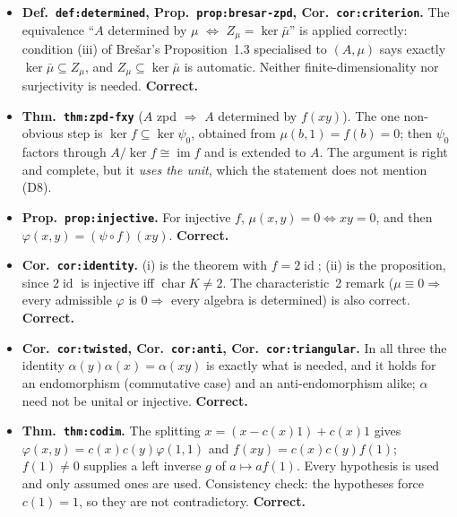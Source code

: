 \documentclass[11pt,a4paper]{article}
\newcommand{\cpt}[1]{\texttt{#1}}          %
\begin{document}
\begin{itemize}
\item \textbf{Def.~\cpt{def:determined}, Prop.~\cpt{prop:bresar-zpd}, Cor.~\cpt{cor:criterion}.}
The equivalence ``$A$ determined by $\mu$ $\iff$ $Z_\mu=\ker\bar\mu$'' is applied correctly: condition
(iii) of Bre\v{s}ar's Proposition~1.3 specialised to $(A,\mu)$ says exactly $\ker\bar\mu\subseteq Z_\mu$,
and $Z_\mu\subseteq\ker\bar\mu$ is automatic. Neither finite-dimensionality nor surjectivity is needed.
\textbf{Correct.}

\item \textbf{Thm.~\cpt{thm:zpd-fxy}} ($A$ zpd $\Rightarrow$ $A$ determined by $f(xy)$). The one
non-obvious step is $\ker f\subseteq\ker\psi_0$, obtained from $\mu(b,1)=f(b)=0$; then $\psi_0$ factors
through $A/\ker f\cong\operatorname{im} f$ and is extended to $A$. The argument is right and complete,
but it \emph{uses the unit}, which the statement does not mention (D8).

\item \textbf{Prop.~\cpt{prop:injective}.} For injective $f$, $\mu(x,y)=0\iff xy=0$, and then
$\varphi(x,y)=(\psi\circ f)(xy)$. \textbf{Correct.}

\item \textbf{Cor.~\cpt{cor:identity}.} (i) is the theorem with $f=2\operatorname{id}$; (ii) is the
proposition, since $2\operatorname{id}$ is injective iff $\operatorname{char}K\ne2$. The characteristic~2
remark ($\mu\equiv0\Rightarrow$ every admissible $\varphi$ is $0\Rightarrow$ every algebra is determined)
is also correct. \textbf{Correct.}

\item \textbf{Cor.~\cpt{cor:twisted}, Cor.~\cpt{cor:anti}, Cor.~\cpt{cor:triangular}.} In all three the
identity $\alpha(y)\alpha(x)=\alpha(xy)$ is exactly what is needed, and it holds for an endomorphism
(commutative case) and an anti-endomorphism alike; $\alpha$ need not be unital or injective.
\textbf{Correct.}

\item \textbf{Thm.~\cpt{thm:codim}.} The splitting $x=(x-c(x)1)+c(x)1$ gives
$\varphi(x,y)=c(x)c(y)\varphi(1,1)$ and $f(xy)=c(x)c(y)f(1)$; $f(1)\ne0$ supplies a left inverse $g$ of
$a\mapsto a f(1)$. Every hypothesis is used and only assumed ones are used. Consistency check: the
hypotheses force $c(1)=1$, so they are not contradictory. \textbf{Correct.}


\end{itemize}
\end{document}
